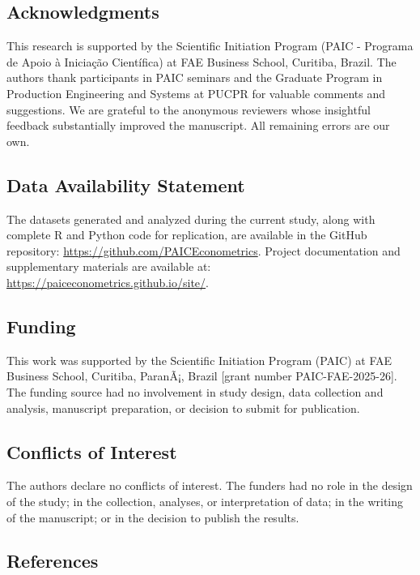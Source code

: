 \documentclass[
  10pt,
  a4paper,
]{article}
\begin{document}
\subsection{Acknowledgments}\label{sec-acknowledgments}

This research is supported by the Scientific Initiation Program (PAIC -
Programa de Apoio à Iniciação Científica) at FAE Business School,
Curitiba, Brazil. The authors thank participants in PAIC seminars and
the Graduate Program in Production Engineering and Systems at PUCPR for
valuable comments and suggestions. We are grateful to the anonymous
reviewers whose insightful feedback substantially improved the
manuscript. All remaining errors are our own.

\subsection{Data Availability Statement}\label{sec-data-availability}

The datasets generated and analyzed during the current study, along with
complete R and Python code for replication, are available in the GitHub
repository: \url{https://github.com/PAICEconometrics}. Project
documentation and supplementary materials are available at:
\url{https://paiceconometrics.github.io/site/}.

\subsection{Funding}\label{sec-funding}

This work was supported by the Scientific Initiation Program (PAIC) at
FAE Business School, Curitiba, ParanÃ¡, Brazil {[}grant number
PAIC-FAE-2025-26{]}. The funding source had no involvement in study
design, data collection and analysis, manuscript preparation, or
decision to submit for publication.

\subsection{Conflicts of Interest}\label{sec-conflicts}

The authors declare no conflicts of interest. The funders had no role in
the design of the study; in the collection, analyses, or interpretation
of data; in the writing of the manuscript; or in the decision to publish
the results.

\subsection{References}\label{sec-references}

\label{refs}
\end{document}
